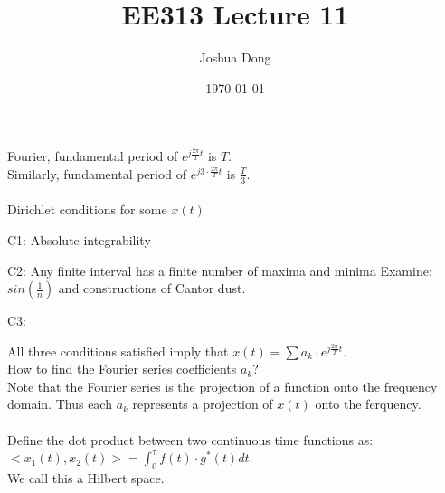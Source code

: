 \documentclass{article}
\begin{document}
\title{EE313\: Lecture 11}
\author{Joshua Dong}
\date{\today}
\maketitle

Fourier, fundamental period of $e^{j\frac{2\pi}{T}t}$ is $T$.
\\Similarly, fundamental period of $e^{j3 \cdot \frac{2\pi}{T}t}$ is
$\frac{T}{3}$.
\\
\\
Dirichlet conditions for some $x(t)$
\begin{description}
    \item{C1: Absolute integrability}
    \item{C2: Any finite interval has a finite number of maxima and minima}
        Examine: $sin(\frac{1}{n})$ and constructions of Cantor dust.
    \item{C3: }
\end{description}
All three conditions satisfied imply that
$x(t) = \sum{a_k \cdot e^{j\frac{2\pi}{T}t}}$.
\\How to find the Fourier series coefficients $a_k$?
\\Note that the Fourier series is the projection of a function onto the
frequency domain. Thus each $a_k$ represents a projection of $x(t)$ onto
the ferquency.
\\
\\Define the dot product between two continuous time functions as:
\\$<x_1(t), x_2(t)> = \int_0^\tau f(t) \cdot g^*(t) dt$.
\\We call this a Hilbert space.
\end{document}
